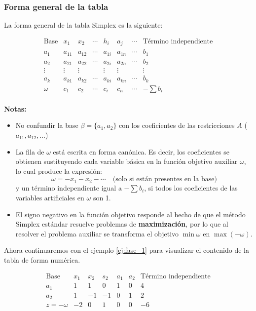 \subsubsection*{Forma general de la tabla}

La forma general de la tabla Simplex es la siguiente:

\[
\begin{array}{c|cccccc|c}
\text{Base} & x_1 & x_2 & \cdots & h_i & a_j & \cdots & \text{Término independiente} \\
\hline
a_1 & a_{11} & a_{12} & \cdots & a_{1i} & a_{1n} & \cdots & b_1 \\
a_2 & a_{21} & a_{22} & \cdots & a_{2i} & a_{2n} & \cdots & b_2 \\
\vdots & \vdots & \vdots & & \vdots & \vdots & & \vdots \\
a_k & a_{k1} & a_{k2} & \cdots & a_{ki} & a_{kn} & \cdots & b_k \\
\hline
\omega & c_1 & c_2 & \cdots & c_i & c_n & \cdots & -\sum b_i \\
\end{array}
\]

\textbf{Notas:}
\begin{itemize}
  \item No confundir la base \(\beta=\{a_1,a_2\}\) con los coeficientes de las restricciones \(A\) (\(a_{11},a_{12},\dots\)) 
  \item La fila de \(\omega\) está escrita en forma canónica. Es decir, los coeficientes se obtienen sustituyendo cada variable básica en la función objetivo auxiliar \(\omega\), lo cual produce la expresión: 
  \[
  \omega = -x_1 - x_2 - \cdots \quad \text{(solo si están presentes en la base)}
  \]
  y un término independiente igual a \( -\sum b_i \), si todos los coeficientes de las variables artificiales en \(\omega\) son 1.
  \item El signo negativo en la función objetivo responde al hecho de que el método Simplex estándar resuelve problemas de \textbf{maximización}, por lo que al resolver el problema auxiliar se transforma el objetivo \( \min \omega \) en \( \max (-\omega) \).
\end{itemize}

\begin{tcolorbox}[myconclusion]
  Ahora continuaremos con el ejemplo \ref{ej:fase_1} para visualizar el contenido de la tabla de forma numérica.
\end{tcolorbox}

\[
\begin{array}{c|rrrrr|r}
\text{Base} & x_1 & x_2 & s_2 & a_1 & a_2 & \text{Término independiente} \\
\hline
a_1 & 1 & 1 & 0 & 1 & 0 & 4 \\
a_2 & 1 & -1 & -1 & 0 & 1 & 2 \\
\hline
z = -\omega & -2 & 0 & 1 & 0 & 0 & -6 \\
\end{array}
\]


